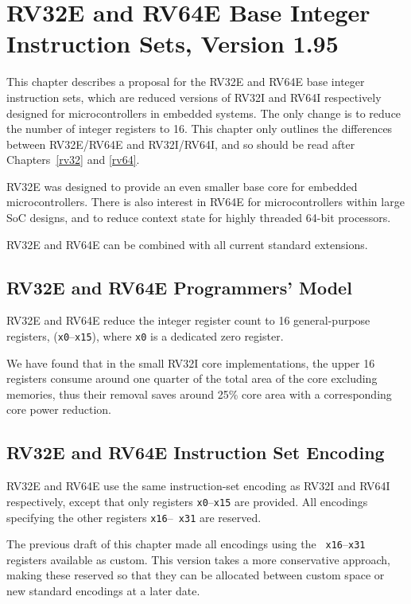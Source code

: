 \chapter{RV32E and RV64E Base Integer Instruction Sets, Version 1.95}
\label{rv32e}

This chapter describes a proposal for the RV32E and RV64E base integer
instruction sets, which are reduced versions of RV32I and RV64I
respectively designed for microcontrollers in embedded systems.  The
only change is to reduce the number of integer registers to 16.  This
chapter only outlines the differences between RV32E/RV64E and
RV32I/RV64I, and so should be read after Chapters~\ref{rv32} and
\ref{rv64}.

\begin{commentary}
RV32E was designed to provide an even smaller base core for embedded
microcontrollers.  There is also interest in RV64E for
microcontrollers within large SoC designs, and to reduce context state
for highly threaded 64-bit processors.

RV32E and RV64E can be combined with all current standard extensions.
\end{commentary}

\section{RV32E and RV64E Programmers' Model}

RV32E and RV64E reduce the integer register count to 16
general-purpose registers, ({\tt x0}--{\tt x15}), where {\tt x0} is a
dedicated zero register.

\begin{commentary}
We have found that in the small RV32I core implementations, the upper
16 registers consume around one quarter of the total area of the core
excluding memories, thus their removal saves around 25\% core area
with a corresponding core power reduction.
\end{commentary}

\section{RV32E and RV64E Instruction Set Encoding}

RV32E and RV64E use the same instruction-set encoding as RV32I and
RV64I respectively, except that only registers {\tt x0}--{\tt x15} are
provided.  All encodings specifying the other registers {\tt x16}--{\tt
  x31} are reserved.

\begin{commentary}
The previous draft of this chapter made all encodings using the {\tt
  x16}--{\tt x31} registers available as custom.  This version takes a
more conservative approach, making these reserved so that they can be
allocated between custom space or new standard encodings at a later
date.
\end{commentary}
